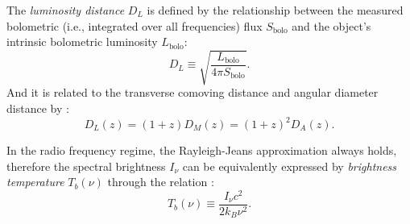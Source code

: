 \documentclass[modern]{aastex61}
\newcommand{\R}[1]{\mathrm{#1}}
\begin{document}
The \emph{luminosity distance} $D_L$ is defined by the relationship
between the measured bolometric (i.e., integrated over all frequencies)
flux $S_{\R{bolo}}$ and the object's intrinsic bolometric luminosity
$L_{\R{bolo}}$:
\begin{equation}
  \label{eq:dl-def}
  D_L \equiv \sqrt{\frac{L_{\R{bolo}}}{4\pi S_{\R{bolo}}}}.
\end{equation}
And it is related to the transverse comoving distance and angular
diameter distance by \citep{weinberg1972,hogg1999,ellis2007}:
\begin{equation}
  \label{eq:dl-dm-da}
  D_L(z) = (1+z) D_M(z) = (1+z)^2 D_A(z).
\end{equation}

In the radio frequency regime, the Rayleigh-Jeans approximation
always holds, therefore the spectral brightness $I_{\nu}$ can be
equivalently expressed by \emph{brightness temperature} $T_b(\nu)$
through the relation \citep{condon2016}:
\begin{equation}
  \label{eq:brightness-temp}
  T_b(\nu) \equiv \frac{I_{\nu} c^2}{2 k_B \nu^2}.
\end{equation}





\end{document}
